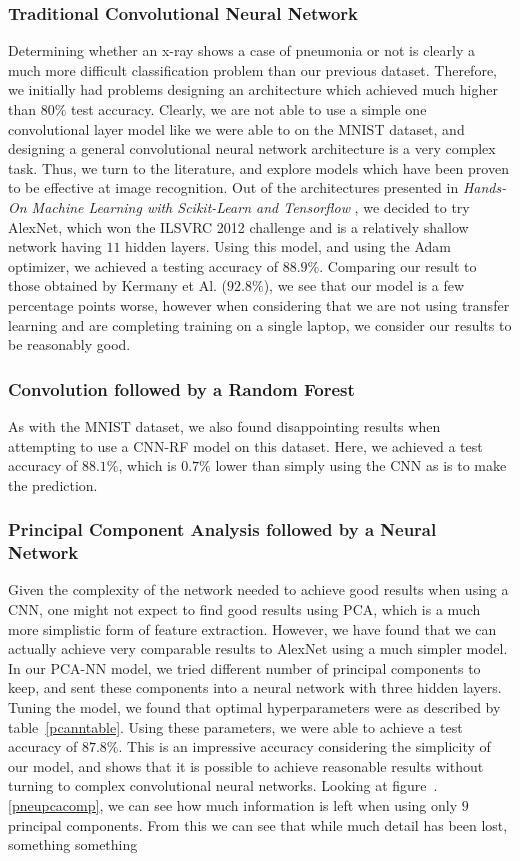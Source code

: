 \documentclass[onecolumn,10pt,cleanfoot]{asme2ej}
\begin{document}
\subsubsection{Traditional Convolutional Neural Network}

Determining whether an x-ray shows a case of pneumonia or not is clearly a much more difficult classification problem than our previous dataset. Therefore, we initially had problems designing an architecture which achieved much higher than $80\%$ test accuracy. Clearly, we are not able to use a simple one convolutional layer model like we were able to on the MNIST dataset, and designing a general convolutional neural network architecture is a very complex task. Thus, we turn to the literature, and explore models which have been proven to be effective at image recognition. Out of the architectures presented in {\it Hands-On Machine Learning with Scikit-Learn and Tensorflow} \cite{geron}, we decided to try AlexNet, which won the ILSVRC 2012 challenge and is a relatively shallow network having $11$ hidden layers. Using this model, and using the Adam optimizer, we achieved a testing accuracy of $88.9\%$. Comparing our result to those obtained by Kermany et Al. ($92.8\%$), we see that our model is a few percentage points worse, however when considering that we are not using transfer learning and are completing training on a single laptop, we consider our results to be reasonably good.

\subsubsection{Convolution followed by a Random Forest}

As with the MNIST dataset, we also found disappointing results when attempting to use a CNN-RF model on this dataset. Here, we achieved a test accuracy of $88.1\%$, which is $0.7\%$ lower than simply using the CNN as is to make the prediction. 

\subsubsection{Principal Component Analysis followed by a Neural Network}

Given the complexity of the network needed to achieve good results when using a CNN, one might not expect to find good results using PCA, which is a much more simplistic form of feature extraction. However, we have found that we can actually achieve very comparable results to AlexNet using a much simpler model. In our PCA-NN model, we tried different number of principal components to keep, and sent these components into a neural network with three hidden layers. Tuning the model, we found that optimal hyperparameters were as described by table~\ref{pcanntable}. Using these parameters, we were able to achieve a test accuracy of $87.8\%$. This is an impressive accuracy considering the simplicity of our model, and shows that it is possible to achieve reasonable results without turning to complex convolutional neural networks. Looking at figure~.\ref{pneupcacomp}, we can see how much information is left when using only $9$ principal components. From this we can see that while much detail has been lost, something something
\end{document}
